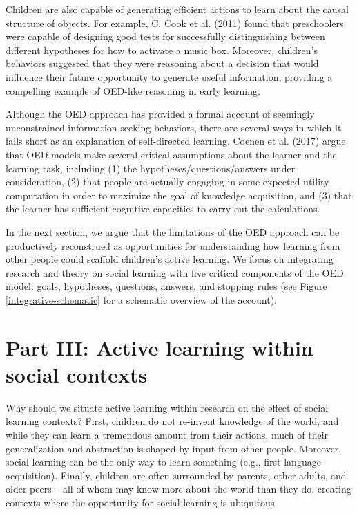 \documentclass[oneside]{report}
\begin{document}
Children are also capable of generating efficient actions to learn about
the causal structure of objects. For example, C. Cook et al. (2011)
found that preschoolers were capable of designing good tests for
successfully distinguishing between different hypotheses for how to
activate a music box. Moreover, children's behaviors suggested that they
were reasoning about a decision that would influence their future
opportunity to generate useful information, providing a compelling
example of OED-like reasoning in early learning.

Although the OED approach has provided a formal account of seemingly
unconstrained information seeking behaviors, there are several ways in
which it falls short as an explanation of self-directed learning. Coenen
et al. (2017) argue that OED models make several critical assumptions
about the learner and the learning task, including (1) the
hypotheses/questions/answers under consideration, (2) that people are
actually engaging in some expected utility computation in order to
maximize the goal of knowledge acquisition, and (3) that the learner has
sufficient cognitive capacities to carry out the calculations.

In the next section, we argue that the limitations of the OED approach
can be productively reconstrued as opportunities for understanding how
learning from other people could scaffold children's active learning. We
focus on integrating research and theory on social learning with five
critical components of the OED model: goals, hypotheses, questions,
answers, and stopping rules (see Figure \ref{integrative-schematic} for
a schematic overview of the account).

\hypertarget{active_social}{\section{Part III: Active learning within
social contexts}\label{active_social}}

Why should we situate active learning within research on the effect of
social learning contexts? First, children do not re-invent knowledge of
the world, and while they can learn a tremendous amount from their
actions, much of their generalization and abstraction is shaped by input
from other people. Moreover, social learning can be the only way to
learn something (e.g., first language acquisition). Finally, children
are often surrounded by parents, other adults, and older peers -- all of
whom may know more about the world than they do, creating contexts where
the opportunity for social learning is ubiquitous.
\end{document}
